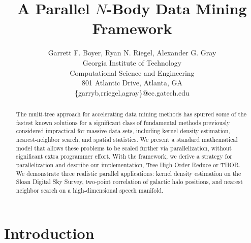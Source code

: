 \documentclass[twoside,leqno,twocolumn]{article}
\begin{document}
\title{A Parallel $N$-Body Data Mining Framework}

\author{Garrett F. Boyer, Ryan N. Riegel, Alexander G. Gray
\\ Georgia Institute of Technology
\\ Computational Science and Engineering
\\ 801 Atlantic Drive, Atlanta, GA
\\ \{garryb,rriegel,agray\}@cc.gatech.edu
\\
}

\maketitle
\thispagestyle{empty}

\begin{abstract}
The multi-tree approach for accelerating data mining methods has spurred some of the fastest known solutions for a significant class of fundamental methods previously considered impractical for massive data sets, including kernel density estimation, nearest-neighbor search, and spatial statistics.
We present a standard mathematical model that allows these problems to be scaled further via parallelization, without significant extra programmer effort.
With the framework, we derive a strategy for parallelization and describe our implementation, Tree High-Order Reduce or THOR.
We demonstrate three realistic parallel applications: kernel density estimation on the Sloan Digital Sky Survey, two-point correlation of galactic halo positions, and nearest neighbor search on a high-dimensional speech manifold.
\end{abstract}

\section{Introduction}
\end{document}
